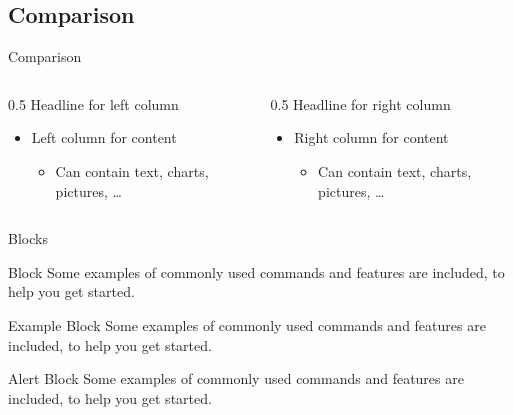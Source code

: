 \documentclass[10pt,compress]{beamer} %
\begin{document}
\subsection{Comparison}
\begin{frame}[t]{Comparison} %
\begin{columns}
  \begin{column}{0.5\textwidth}
  	{\large \textcolor{hellblauMUW}{Headline for left column}}
    \begin{itemize}
	  \item Left column for content
	  \begin{itemize}
	  	\item Can contain text, charts, pictures, … 
		\end{itemize}
	\end{itemize}
  \end{column}
  \begin{column}{0.5\textwidth}  %
  {\large \textcolor{hellblauMUW}{Headline for right column}}
    \begin{itemize}
	  \item Right column for content
	  \begin{itemize}
	  	\item Can contain text, charts, pictures, … 
		\end{itemize}
	\end{itemize}
  \end{column}
\end{columns}
\end{frame}


\begin{frame}{Blocks}

\begin{block}{Block}
Some examples of commonly used commands and features are included, to help you get started.
\end{block}

\begin{exampleblock}{Example Block}
Some examples of commonly used commands and features are included, to help you get started.
\end{exampleblock}

\begin{alertblock}{Alert Block}
Some examples of commonly used commands and features are included, to help you get started.
\end{alertblock}

\end{frame}
\end{document}
